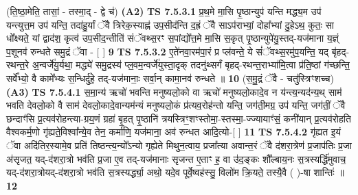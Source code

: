\documentclass[17pt]{extarticle}
\begin{document}
                  \newline
                      (ति॒ष्ठा॒मेति॒ तासां॒ - तस्मा॒द् - द्वे च॑)  \textbf{(A2)} \newline \newline
                                        \textbf{ TS 7.5.3.1} \newline
                  प्र॒थ॒मे मा॒सि पृ॒ष्ठान्युप॑ यन्ति मद्ध्य॒म उप॑ यन्त्युत्त॒म उप॑ यन्ति॒ तदा॑हु॒र्यां ॅवै त्रिरेक॒स्याह्न॑ उप॒सीद॑न्ति द॒ह्रं ॅवै साऽप॑राभ्यां॒ दोहा᳚भ्यां दु॒हेऽथ॒ कुतः॒ सा धो᳚क्ष्यते॒ यां द्वाद॑श॒ कृत्व॑ उप॒सीद॒न्तीति॑ संॅवथ्स॒रꣳ स॒पांद्यो᳚त्त॒मे मा॒सि स॒कृत् पृ॒ष्ठान्युपे॑यु॒स्तद्-यज॑माना य॒ज्ञ्ं प॒शूनव॑ रुन्धते समु॒द्रं ॅवा - [  ] \textbf{  9} \newline
                  \newline
                                \textbf{ TS 7.5.3.2} \newline
                  ए॒ते॑नवा॒रम॑पा॒रं प्र प्ल॑वन्ते॒ ये सं॑ॅवथ्स॒रमु॑प॒यन्ति॒ यद् बृ॑हद्-रथन्त॒रे अ॒न्वर्जे॑यु॒र्यथा॒ मद्ध्ये॑ समु॒द्रस्य॑ प्ल॒वम॒न्वर्जे॑युस्ता॒दृक् तदनु॑थ्सर्गं बृहद्-रथन्त॒राभ्या॑मि॒त्वा प्र॑ति॒ष्ठां ग॑च्छन्ति॒ सर्वे᳚भ्यो॒ वै कामे᳚भ्यः स॒न्धिर्दु॑हे॒ तद्-यज॑मानाः॒ सर्वा॒न् कामा॒नव॑ रुन्धते ॥ \textbf{  10} \newline
                  \newline
                      (स॒मु॒द्रं ॅवै - चतु॑स्त्रिꣳशच्च)  \textbf{(A3)} \newline \newline
                                        \textbf{ TS 7.5.4.1} \newline
                  स॒मा॒न्य॑ ऋचो॑ भवन्ति मनुष्यलो॒को वा ऋचो॑ मनुष्यलो॒कादे॒व न य॑न्त्य॒न्यद॑न्य॒थ् साम॑ भवति देवलो॒को वै साम॑ देवलो॒कादे॒वान्यम॑न्यं मनुष्यलो॒कं प्र॑त्यव॒रोह॑न्तो यन्ति॒ जग॑ती॒मग्र॒ उप॑ यन्ति॒ जग॑तीं॒ ॅवै छन्दाꣳ॑सि प्र॒त्यव॑रोहन्त्या-ग्रय॒णं ग्रहा॑ बृ॒हत् पृ॒ष्ठानि॑ त्रयस्त्रिꣳ॒॒शꣳस्तोमा॒-स्तस्मा॒-ज्ज्यायाꣳ॑सं॒ कनी॑यान् प्र॒त्यव॑रोहति वैश्वकर्म॒णो गृ॑ह्यते॒विश्वा᳚न्ये॒व तेन॒ कर्मा॑णि॒ यज॑माना॒ अव॑ रुन्धत आदि॒त्यो-[  ] \textbf{  11} \newline
                  \newline
                                \textbf{ TS 7.5.4.2} \newline
                  गृ॑ह्यत इ॒यं ॅवा अदि॑तिर॒स्यामे॒व प्रति॑ तिष्ठन्त्य॒न्यो᳚ऽन्यो गृह्येते मिथुन॒त्वाय॒ प्रजा᳚त्या अवान्त॒रं ॅवै द॑शरा॒त्रेण॑ प्र॒जाप॑तिः प्र॒जा अ॑सृजत॒ यद्-द॑शरा॒त्रो भव॑ति प्र॒जा ए॒व तद्-यज॑मानाः सृजन्त ए॒ताꣳ ह॒ वा उ॑द॒ङ्कः शौ᳚ल्बाय॒नः स॒त्रस्यर्द्धि॑मुवाच॒ यद्-द॑शरा॒त्रोयद्-द॑शरा॒त्रो भव॑ति स॒त्रस्यर्द्ध्या॒ अथो॒ यदे॒व पूर्वे॒ष्वह॑स्सु॒ विलो॑म क्रि॒यते॒ तस्यै॒वै ( )-षा शान्तिः॑ ॥ \textbf{  12} \newline
\end{document}
